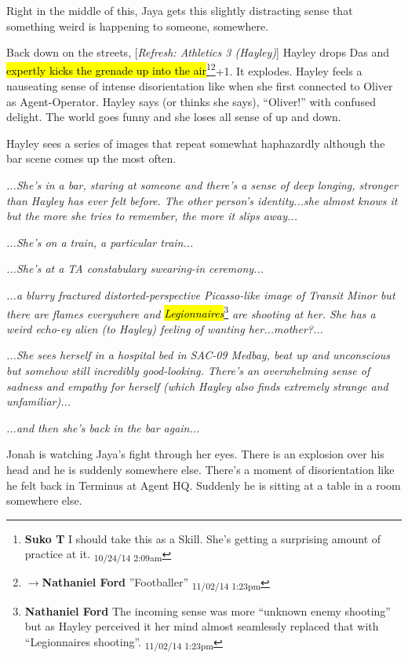 Right in the middle of this, Jaya gets this slightly distracting sense that something weird is happening to someone, somewhere.



Back down on the streets, {[}\textit{Refresh: Athletics 3 (Hayley)}{]} Hayley drops Das and \hl{expertly kicks the grenade up into the air}\footnote{\textbf{Suko T }I should take this as a Skill.  She's getting a surprising amount of practice at it. \textsubscript{10/24/14 2:09am}}\footnote{$\rightarrow$\textbf{Nathaniel Ford }''Footballer'' \textsubscript{11/02/14 1:23pm}}+1.  It explodes.  Hayley feels a nauseating sense of intense disorientation like when she first connected to Oliver as Agent-Operator.  Hayley says (or thinks she says), ``Oliver!'' with confused delight.  The world goes funny and she loses all sense of up and down.  

Hayley sees a series of images that repeat somewhat haphazardly although the bar scene comes up the most often.

\textit{...She's in a bar, staring at someone and there's a sense of deep longing, stronger than Hayley has ever felt before.  The other person's identity...she almost knows it but the more she tries to remember, the more it slips away... }

\textit{...She's on a train, a particular train...}

\textit{...She's at a TA constabulary swearing-in ceremony...}

\textit{...a blurry fractured distorted-perspective Picasso-like image of Transit Minor but there are flames everywhere and }\textit{\hl{Legionnaires}}\footnote{\textbf{Nathaniel Ford }The incoming sense was more ``unknown enemy shooting'' but as Hayley perceived it her mind almost seamlessly replaced that with ``Legionnaires shooting''. \textsubscript{11/02/14 1:23pm}}\textit{ are shooting at her.  She has a weird echo-ey alien (to Hayley) feeling of wanting her...mother?...}

\textit{...She sees herself in a hospital bed in SAC-09 Medbay, beat up and unconscious but somehow still incredibly good-looking.  There's an overwhelming sense of sadness and empathy for herself (which Hayley also finds extremely strange and unfamiliar)...}

\textit{...and then she's back in the bar again...}



Jonah is watching Jaya's fight through her eyes.  There is an explosion over his head and he is suddenly somewhere else.  There's a moment of disorientation like he felt back in Terminus at Agent HQ.  Suddenly he is sitting at a table in a room somewhere else.  

